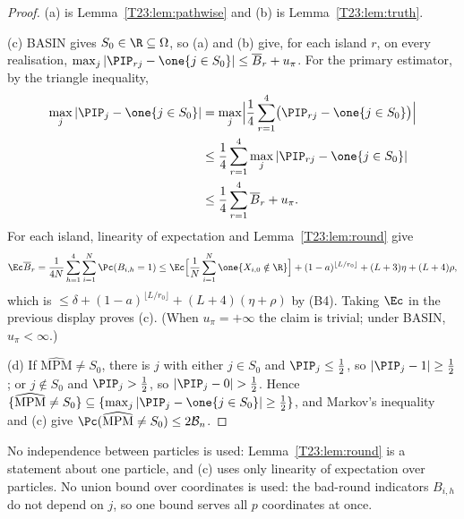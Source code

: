 \documentclass[11pt]{report}
\begin{document}
\begin{proof}
(a) is Lemma~\ref{T23:lem:pathwise} and (b) is Lemma~\ref{T23:lem:truth}.

(c) BASIN gives $S_0\in\R\subseteq\Omega$, so (a) and (b) give, for each island $r$, on every realisation,
$\max_j|\PIP_{rj}-\one\{j\in S_0\}|\le\overline B_r+u_\pi$. For the primary estimator, by the triangle inequality,
\begin{align*}
\max_j|\PIP_j-\one\{j\in S_0\}|&=\max_j\Bigl|\frac14\sum_{r=1}^4\bigl(\PIP_{rj}-\one\{j\in S_0\}\bigr)\Bigr|\\
&\le\frac14\sum_{r=1}^4\max_j|\PIP_{rj}-\one\{j\in S_0\}|\\
&\le\frac14\sum_{r=1}^4\overline B_r+u_\pi .
\end{align*}
For each island, linearity of expectation and Lemma~\ref{T23:lem:round} give
\[
\Ec\overline B_r=\frac1{4N}\sum_{h=1}^4\sum_{i=1}^N\Pc(B_{i,h}=1)
\le\Ec\Bigl[\frac1N\sum_{i=1}^N\one\{X_{i,0}\notin\R\}\Bigr]+(1-a)^{\lfloor L/r_0\rfloor}+(L+3)\eta+(L+4)\rho,
\]
which is $\le\delta+(1-a)^{\lfloor L/r_0\rfloor}+(L+4)(\eta+\rho)$ by (B4). Taking $\Ec$ in the previous display proves (c). (When $u_\pi=+\infty$ the claim is trivial; under BASIN, $u_\pi<\infty$.)

(d) If $\widehat{\mathrm{MPM}}\neq S_0$, there is $j$ with either $j\in S_0$ and $\PIP_j\le\frac12$, so $|\PIP_j-1|\ge\frac12$; or $j\notin S_0$ and $\PIP_j>\frac12$, so $|\PIP_j-0|>\frac12$. Hence $\{\widehat{\mathrm{MPM}}\ne S_0\}\subseteq\{\max_j|\PIP_j-\one\{j\in S_0\}|\ge\frac12\}$, and Markov's inequality and (c) give $\Pc(\widehat{\mathrm{MPM}}\ne S_0)\le2\mathcal B_n$.
\end{proof}

\begin{T23remark}
No independence between particles is used: Lemma~\ref{T23:lem:round} is a statement about one particle, and (c) uses only linearity of expectation over particles. No union bound over coordinates is used: the bad-round indicators $B_{i,h}$ do not depend on $j$, so one bound serves all $p$ coordinates at once.
\end{T23remark}
\end{document}
